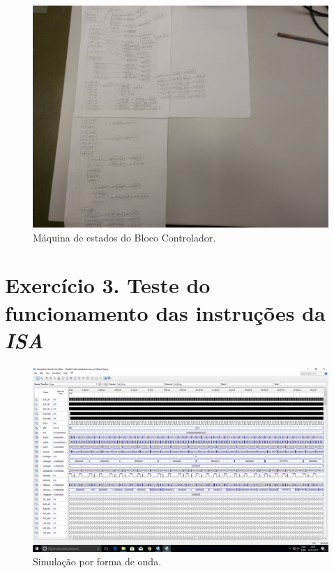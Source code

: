 \documentclass[12pt]{article}
\begin{document}
\begin{figure}[H]
	\flushleft
	\includegraphics[width=1\textwidth]{maquina_estados.jpg}
	\caption{Máquina de estados do Bloco Controlador.}
	\label{fig:pfunct}
\end{figure}




\section{Exercício 3. Teste do funcionamento das instruções da \textit{ISA} }
\label{sec:testeisa}

\begin{figure}[H]
	\flushleft
	\includegraphics[width=1\textwidth]{waveform.png}
	\caption{Simulação por forma de onda.}
	\label{fig:pfunct}
\end{figure}
\end{document}
